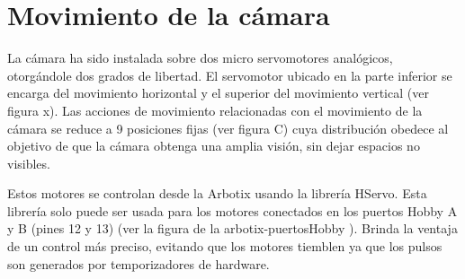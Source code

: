 \section{Movimiento de la cámara}
La cámara ha sido instalada sobre dos micro servomotores analógicos, otorgándole dos grados de libertad. El servomotor ubicado en la parte inferior se encarga del movimiento horizontal y el superior del movimiento vertical (ver figura x). Las acciones de movimiento relacionadas con el movimiento de la cámara se reduce a 9 posiciones fijas (ver figura C) cuya distribución obedece al objetivo de que la cámara obtenga una amplia visión, sin dejar espacios no visibles. 


Estos motores se controlan desde la Arbotix usando la librería HServo. Esta librería solo puede ser usada para los motores conectados en los puertos Hobby A y B (pines 12 y 13) (ver la figura de la arbotix-puertosHobby ). Brinda la ventaja de un control más preciso, evitando que los motores tiemblen ya que los pulsos son generados por temporizadores de hardware. 


